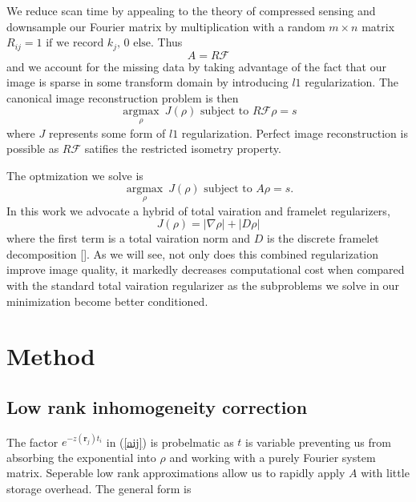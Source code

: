 \documentclass[11pt]{amsart}
\theoremstyle{remark}
\begin{document}
We reduce scan time by appealing to the theory of compressed sensing and downsample our Fourier matrix by multiplication with a random $m \times n$ matrix $R_{ij} = 1 \text{ if we record } k_j \text{, } 0 \text{ else}$. Thus
\begin{equation}
A = R\mathcal{F}
\end{equation}
and we account for the missing data by taking advantage of the fact that our image is sparse in some transform domain by introducing $l1$ regularization. The canonical image reconstruction problem is then
\begin{equation}\label{csequ}
\underset{\rho}{\operatorname{argmax}} \: J(\rho)  \text{ subject to } R\mathcal{F} \rho = s
\end{equation}
where $J$ represents some form of $l1$ regularization. Perfect image reconstruction is possible as $R\mathcal{F}$ satifies the restricted isometry property.


The optmization we solve is
\begin{equation}\label{gcsequ}
\underset{\rho}{\operatorname{argmax}} \: J(\rho)  \text{ subject to } A \rho = s.
\end{equation}
In this work we advocate a hybrid of total vairation and framelet regularizers,
\begin{equation}
J(\rho) = | \nabla \rho| + | D \rho |
\end{equation}
where the first term is a total vairation norm and $D$ is the discrete framelet decomposition []. As we will see, not only does this combined regularization improve image quality, it markedly decreases computational cost when compared with the standard total vairation regularizer as the subproblems we solve in our minimization become better conditioned.

\section{Method}

\subsection{Low rank inhomogeneity correction}
The factor $e^{-z(\mathbf{r}_j)t_i}$ in (\ref{aij}) is probelmatic as $t$ is variable preventing us from absorbing the exponential into $\rho$ and working with a purely Fourier system matrix. Seperable low rank approximations allow us to rapidly apply $A$ with little storage overhead. The general form is 
\end{document}
